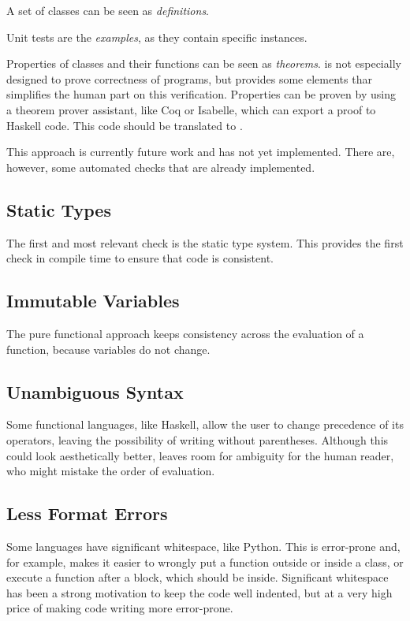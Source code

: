 A set of \Soda classes can be seen as \textit{definitions}.

Unit tests are the \textit{examples}, as they contain specific instances.

Properties of classes and their functions can be seen as \textit{theorems}.
\Soda is not especially designed to prove correctness of programs, but provides some elements thar simplifies the human part on this verification.
Properties can be proven by using a theorem prover assistant, like Coq or Isabelle, which can export a proof to Haskell code.
This code should be translated to \Soda.

This approach is currently future work and has not yet implemented.
There are, however, some automated checks that are already implemented.

\subsection{Static Types}

The first and most relevant check is the static type system.
This provides the first check in compile time to ensure that \Soda code is consistent.

\subsection{Immutable Variables}

The pure functional approach keeps consistency across the evaluation of a function, because variables do not change.

\subsection{Unambiguous Syntax}

Some functional languages, like Haskell, allow the user to change precedence of its operators, leaving the possibility of writing without parentheses.
Although this could look aesthetically better, leaves room for ambiguity for the human reader, who might mistake the order of evaluation.

\subsection{Less Format Errors}

Some languages have significant whitespace, like Python.
This is error-prone and, for example, makes it easier to wrongly put a function outside or inside a class, or execute a function after a block, which should be inside.
Significant whitespace has been a strong motivation to keep the code well indented, but at a very high price of making code writing more error-prone.

